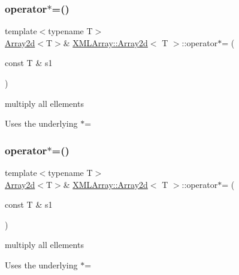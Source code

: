 \subsubsection{\texorpdfstring{operator$\ast$=()}{operator*=()}\hspace{0.1cm}{\footnotesize\ttfamily [4/6]}}
{\footnotesize\ttfamily template$<$typename T$>$ \\
\mbox{\hyperlink{classXMLArray_1_1Array2d}{Array2d}}$<$T$>$\& \mbox{\hyperlink{classXMLArray_1_1Array2d}{X\+M\+L\+Array\+::\+Array2d}}$<$ T $>$\+::operator$\ast$= (\begin{DoxyParamCaption}\item[{const T \&}]{s1 }\end{DoxyParamCaption})\hspace{0.3cm}{\ttfamily [inline]}}



multiply all ellements 

Uses the underlying $\ast$= \mbox{\label{classXMLArray_1_1Array2d_aee0e6a53c2f9dcc263ba59286d359b38}} 
\subsubsection{\texorpdfstring{operator$\ast$=()}{operator*=()}\hspace{0.1cm}{\footnotesize\ttfamily [5/6]}}
{\footnotesize\ttfamily template$<$typename T$>$ \\
\mbox{\hyperlink{classXMLArray_1_1Array2d}{Array2d}}$<$T$>$\& \mbox{\hyperlink{classXMLArray_1_1Array2d}{X\+M\+L\+Array\+::\+Array2d}}$<$ T $>$\+::operator$\ast$= (\begin{DoxyParamCaption}\item[{const T \&}]{s1 }\end{DoxyParamCaption})\hspace{0.3cm}{\ttfamily [inline]}}



multiply all ellements 

Uses the underlying $\ast$= \mbox{\label{classXMLArray_1_1Array2d_aee0e6a53c2f9dcc263ba59286d359b38}} 
